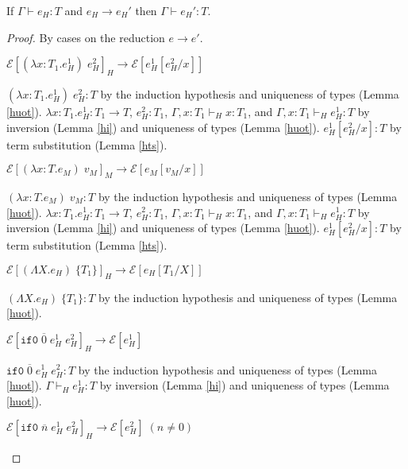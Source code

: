 \begin{hpn}
\label{hpn}
\onehalfspacing
If $\Gamma\vdash e_{H}:T$ and $e_{H}\rightarrow e_{H}'$ then $\Gamma\vdash e_{H}':T$.
\begin{proof}
By cases on the reduction $e\rightarrow e'$.
\begin{hpn-case-1}
$\mathscr{E}[(\lambda x:T_{1}.e_{H}^{1})\;e_{H}^{2}]_{H}\rightarrow\mathscr{E}[e_{H}^{1}[e_{H}^{2}/x]]$

$(\lambda x:T_{1}.e_{H}^{1})\;e_{H}^{2}:T$ by the induction hypothesis and uniqueness of types (Lemma \ref{huot}).  $\lambda x:T_{1}.e_{H}^{1}:T_{1}\rightarrow T$, $e_{H}^{2}:T_{1}$, $\Gamma,x:T_{1}\vdash_{H}x:T_{1}$, and $\Gamma,x:T_{1}\vdash_{H}e_{H}^{1}:T$ by inversion (Lemma \ref{hi}) and uniqueness of types (Lemma \ref{huot}).  $e_{H}^{1}[e_{H}^{2}/x]:T$ by term substitution (Lemma \ref{hts}).
\end{hpn-case-1}
\begin{hpn-case-1}
$\mathscr{E}[(\lambda x:T.e_{M})\;v_{M}]_{M}\rightarrow\mathscr{E}[e_{M}[v_{M}/x]]$

$(\lambda x:T.e_{M})\;v_{M}:T$ by the induction hypothesis and uniqueness of types (Lemma \ref{huot}).  $\lambda x:T_{1}.e_{H}^{1}:T_{1}\rightarrow T$, $e_{H}^{2}:T_{1}$, $\Gamma,x:T_{1}\vdash_{H}x:T_{1}$, and $\Gamma,x:T_{1}\vdash_{H}e_{H}^{1}:T$ by inversion (Lemma \ref{hi}) and uniqueness of types (Lemma \ref{huot}).  $e_{H}^{1}[e_{H}^{2}/x]:T$ by term substitution (Lemma \ref{hts}).
\end{hpn-case-1}
\begin{hpn-case-2}
$\mathscr{E}[(\Lambda X.e_{H})\;\lbrace T_{1}\rbrace]_{H}\rightarrow\mathscr{E}[e_{H}[T_{1}/X]]$

$(\Lambda X.e_{H})\;\lbrace T_{1}\rbrace:T$ by the induction hypothesis and uniqueness of types (Lemma \ref{huot}).

\end{hpn-case-2}
\begin{hpn-case-3}
$\mathscr{E}[\mathtt{if0}\;\overline{0}\;e_{H}^{1}\;e_{H}^{2}]_{H}\rightarrow\mathscr{E}[e_{H}^{1}]$

$\mathtt{if0}\;\overline{0}\;e_{H}^{1}\;e_{H}^{2}:T$ by the induction hypothesis and uniqueness of types (Lemma \ref{huot}).  $\Gamma\vdash_{H}e_{H}^{1}:T$ by inversion (Lemma \ref{hi}) and uniqueness of types (Lemma \ref{huot}).
\end{hpn-case-3}
\begin{hpn-case-4}
$\mathscr{E}[\mathtt{if0}\;\overline{n}\;e_{H}^{1}\;e_{H}^{2}]_{H}\rightarrow\mathscr{E}[e_{H}^{2}]\;(n\neq0)$


\end{hpn-case-4}
\end{proof}
\end{hpn}

